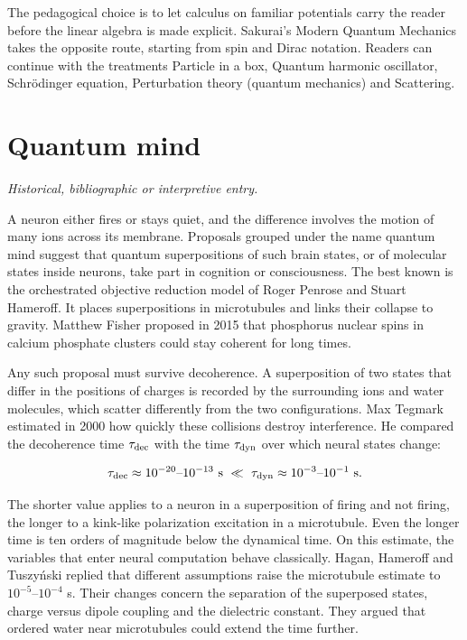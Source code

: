 \documentclass[11pt,oneside]{book}
\newenvironment{centeredalign}{\[\begin{gathered}[c]}{\end{gathered}\]}
\begin{document}
The pedagogical choice is to let calculus on familiar potentials carry the reader before the linear algebra is made explicit. Sakurai's Modern Quantum Mechanics takes the opposite route, starting from spin and Dirac notation. Readers can continue with the treatments Particle in a box, Quantum harmonic oscillator, Schrödinger equation, Perturbation theory (quantum mechanics) and Scattering.







\clearpage

\section{Quantum mind}

\label{topic:quantum-mind}

\par\smallskip\noindent\textit{Historical, bibliographic or interpretive entry.}

A neuron either fires or stays quiet, and the difference involves the motion of many ions across its membrane. Proposals grouped under the name quantum mind suggest that quantum superpositions of such brain states, or of molecular states inside neurons, take part in cognition or consciousness. The best known is the orchestrated objective reduction model of Roger Penrose and Stuart Hameroff. It places superpositions in microtubules and links their collapse to gravity. Matthew Fisher proposed in 2015 that phosphorus nuclear spins in calcium phosphate clusters could stay coherent for long times.

Any such proposal must survive decoherence. A superposition of two states that differ in the positions of charges is recorded by the surrounding ions and water molecules, which scatter differently from the two configurations. Max Tegmark estimated in 2000 how quickly these collisions destroy interference. He compared the decoherence time \(\tau_{\rm dec}\) with the time \(\tau_{\rm dyn}\) over which neural states change:

\begin{centeredalign}
\tau_{\rm dec}\approx10^{-20}\text{--}10^{-13}\ \mathrm{s}\ \ll\
\tau_{\rm dyn}\approx10^{-3}\text{--}10^{-1}\ \mathrm{s}.
\end{centeredalign}

The shorter value applies to a neuron in a superposition of firing and not firing, the longer to a kink-like polarization excitation in a microtubule. Even the longer time is ten orders of magnitude below the dynamical time. On this estimate, the variables that enter neural computation behave classically. Hagan, Hameroff and Tuszyński replied that different assumptions raise the microtubule estimate to \(10^{-5}\)--\(10^{-4}\) s. Their changes concern the separation of the superposed states, charge versus dipole coupling and the dielectric constant. They argued that ordered water near microtubules could extend the time further.
\end{document}
